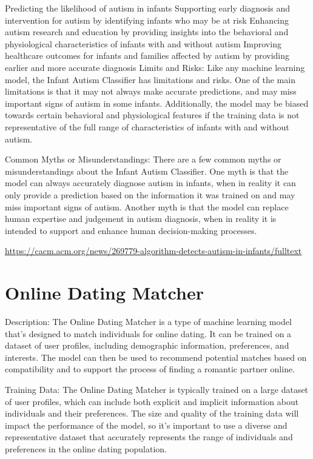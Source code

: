 Predicting the likelihood of autism in infants
Supporting early diagnosis and intervention for autism by identifying infants who may be at risk
Enhancing autism research and education by providing insights into the behavioral and physiological characteristics of infants with and without autism
Improving healthcare outcomes for infants and families affected by autism by providing earlier and more accurate diagnosis
Limits and Risks:
Like any machine learning model, the Infant Autism Classifier has limitations and risks. One of the main limitations is that it may not always make accurate predictions, and may miss important signs of autism in some infants. Additionally, the model may be biased towards certain behavioral and physiological features if the training data is not representative of the full range of characteristics of infants with and without autism.

Common Myths or Misunderstandings:
There are a few common myths or misunderstandings about the Infant Autism Classifier. One myth is that the model can always accurately diagnose autism in infants, when in reality it can only provide a prediction based on the information it was trained on and may miss important signs of autism. Another myth is that the model can replace human expertise and judgement in autism diagnosis, when in reality it is intended to support and enhance human decision-making processes.

\url{https://cacm.acm.org/news/269779-algorithm-detects-autism-in-infants/fulltext}

\section{Online Dating Matcher}

Description:
The Online Dating Matcher is a type of machine learning model that's designed to match individuals for online dating. It can be trained on a dataset of user profiles, including demographic information, preferences, and interests. The model can then be used to recommend potential matches based on compatibility and to support the process of finding a romantic partner online.

Training Data:
The Online Dating Matcher is typically trained on a large dataset of user profiles, which can include both explicit and implicit information about individuals and their preferences. The size and quality of the training data will impact the performance of the model, so it's important to use a diverse and representative dataset that accurately represents the range of individuals and preferences in the online dating population.


